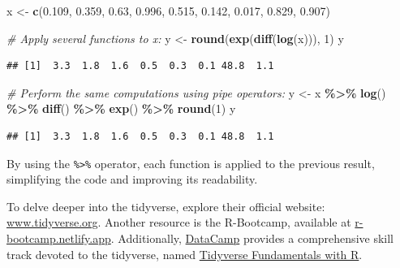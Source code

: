\documentclass[
]{book}
\newenvironment{Shaded}{\begin{snugshade}}{\end{snugshade}}
\newcommand{\CommentTok}[1]{\textcolor[rgb]{0.56,0.35,0.01}{\textit{#1}}}
\newcommand{\DecValTok}[1]{\textcolor[rgb]{0.00,0.00,0.81}{#1}}
\newcommand{\FloatTok}[1]{\textcolor[rgb]{0.00,0.00,0.81}{#1}}
\newcommand{\FunctionTok}[1]{\textcolor[rgb]{0.13,0.29,0.53}{\textbf{#1}}}
\newcommand{\NormalTok}[1]{#1}
\newcommand{\OtherTok}[1]{\textcolor[rgb]{0.56,0.35,0.01}{#1}}
\newcommand{\SpecialCharTok}[1]{\textcolor[rgb]{0.81,0.36,0.00}{\textbf{#1}}}
\begin{document}
\begin{Shaded}
\begin{Highlighting}[]
\NormalTok{x }\OtherTok{\textless{}{-}} \FunctionTok{c}\NormalTok{(}\FloatTok{0.109}\NormalTok{, }\FloatTok{0.359}\NormalTok{, }\FloatTok{0.63}\NormalTok{, }\FloatTok{0.996}\NormalTok{, }\FloatTok{0.515}\NormalTok{, }\FloatTok{0.142}\NormalTok{, }\FloatTok{0.017}\NormalTok{, }\FloatTok{0.829}\NormalTok{, }\FloatTok{0.907}\NormalTok{)}

\CommentTok{\# Apply several functions to x:}
\NormalTok{y }\OtherTok{\textless{}{-}} \FunctionTok{round}\NormalTok{(}\FunctionTok{exp}\NormalTok{(}\FunctionTok{diff}\NormalTok{(}\FunctionTok{log}\NormalTok{(x))), }\DecValTok{1}\NormalTok{)}
\NormalTok{y}
\end{Highlighting}
\end{Shaded}

\begin{verbatim}
## [1]  3.3  1.8  1.6  0.5  0.3  0.1 48.8  1.1
\end{verbatim}

\begin{Shaded}
\begin{Highlighting}[]
\CommentTok{\# Perform the same computations using pipe operators:}
\NormalTok{y }\OtherTok{\textless{}{-}}\NormalTok{ x }\SpecialCharTok{\%\textgreater{}\%} \FunctionTok{log}\NormalTok{() }\SpecialCharTok{\%\textgreater{}\%} \FunctionTok{diff}\NormalTok{() }\SpecialCharTok{\%\textgreater{}\%} \FunctionTok{exp}\NormalTok{() }\SpecialCharTok{\%\textgreater{}\%} \FunctionTok{round}\NormalTok{(}\DecValTok{1}\NormalTok{)}
\NormalTok{y}
\end{Highlighting}
\end{Shaded}

\begin{verbatim}
## [1]  3.3  1.8  1.6  0.5  0.3  0.1 48.8  1.1
\end{verbatim}

By using the \texttt{\%\textgreater{}\%} operator, each function is applied to the previous result, simplifying the code and improving its readability.

To delve deeper into the tidyverse, explore their official website: \href{https://www.tidyverse.org}{www.tidyverse.org}. Another resource is the R-Bootcamp, available at \href{https://r-bootcamp.netlify.app/}{r-bootcamp.netlify.app}. Additionally, \href{https://learn.datacamp.com/}{DataCamp} provides a comprehensive skill track devoted to the tidyverse, named \href{https://learn.datacamp.com/skill-tracks/tidyverse-fundamentals}{Tidyverse Fundamentals with R}.
\end{document}
